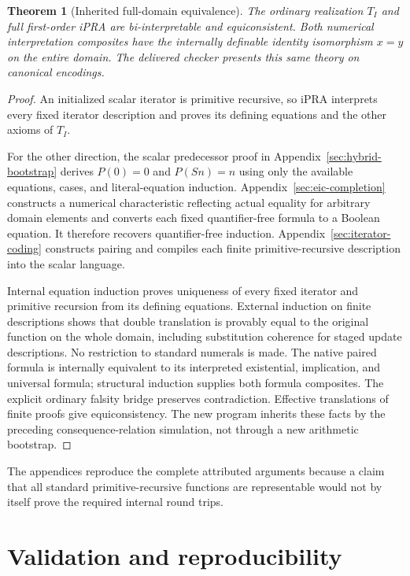 \documentclass[11pt,letterpaper]{article}
\newtheorem{theorem}{Theorem}[section]
\theoremstyle{definition}\newtheorem{definition}[theorem]{Definition}
\theoremstyle{remark}\newtheorem{remark}[theorem]{Remark}
\begin{document}
\begin{theorem}[Inherited full-domain equivalence]
The ordinary realization $T_I$ and full first-order iPRA are bi-interpretable
and equiconsistent. Both numerical interpretation composites have the
internally definable identity isomorphism $x=y$ on the entire domain.
The delivered checker presents this same theory on canonical encodings.
\end{theorem}
\begin{proof}
An initialized scalar iterator is primitive recursive, so iPRA interprets
every fixed iterator description and proves its defining equations and the
other axioms of $T_I$.

For the other direction, the scalar predecessor proof in
Appendix~\ref{sec:hybrid-bootstrap} derives $P(0)=0$ and $P(Sn)=n$ using
only the available equations, cases, and literal-equation induction.
Appendix~\ref{sec:eic-completion} constructs a numerical characteristic
reflecting actual equality for arbitrary domain elements and converts each
fixed quantifier-free formula to a Boolean equation. It therefore recovers
quantifier-free induction. Appendix~\ref{sec:iterator-coding} constructs
pairing and compiles each finite primitive-recursive description into the
scalar language.

Internal equation induction proves uniqueness of every fixed iterator and
primitive recursion from its defining equations. External induction on finite
descriptions shows that double translation is provably equal to the original
function on the whole domain, including substitution coherence for staged
update descriptions. No restriction to standard numerals is made. The native
paired formula is internally equivalent to its interpreted existential,
implication, and universal formula; structural induction supplies both formula
composites. The explicit ordinary falsity bridge preserves contradiction.
Effective translations of finite proofs give equiconsistency. The new program
inherits these facts by the preceding consequence-relation simulation, not
through a new arithmetic bootstrap.
\end{proof}

The appendices reproduce the complete attributed arguments because a claim
that all standard primitive-recursive functions are representable would not
by itself prove the required internal round trips.

\section{Validation and reproducibility}
\end{document}
